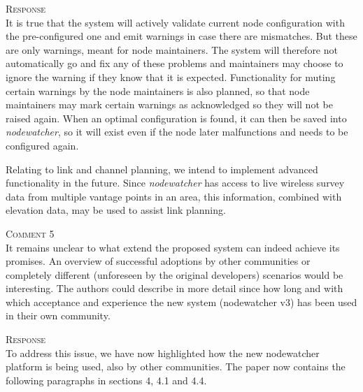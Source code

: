 \documentclass[12pt,twoside,a4paper]{report}
\newcommand{\nodewatcher}{\textit{nodewatcher}}
\begin{document}
\vspace{0.5cm}\noindent\textsc{Response}\\
It is true that the system will actively validate current node configuration with the pre-configured one and emit warnings in case there are mismatches.
But these are only warnings, meant for node maintainers.
The system will therefore not automatically go and fix any of these problems and maintainers may choose to ignore the warning if they know that it is expected.
Functionality for muting certain warnings by the node maintainers is also planned, so that node maintainers may mark certain warnings as acknowledged so they will not be raised again.
When an optimal configuration is found, it can then be saved into \nodewatcher{}, so it will exist even if the node later malfunctions and needs to be configured again.

Relating to link and channel planning, we intend to implement advanced functionality in the future.
Since \nodewatcher{} has access to live wireless survey data from multiple vantage points in an area, this information, combined with elevation data, may be used to assist link planning.

\vspace{0.5cm}\noindent\textsc{Comment 5}\\
It remains unclear to what extend the proposed system can indeed achieve its promises. An overview of successful adoptions by other communities or completely different (unforeseen by the original developers) scenarios would be interesting. The authors could describe in more detail since how long and with which acceptance and experience the new system (nodewatcher v3) has been used in their own community.

\vspace{0.5cm}\noindent\textsc{Response}\\
To address this issue, we have now highlighted how the new nodewatcher platform is being used, also by other communities.
The paper now contains the following paragraphs in sections 4, 4.1 and 4.4.
\end{document}
